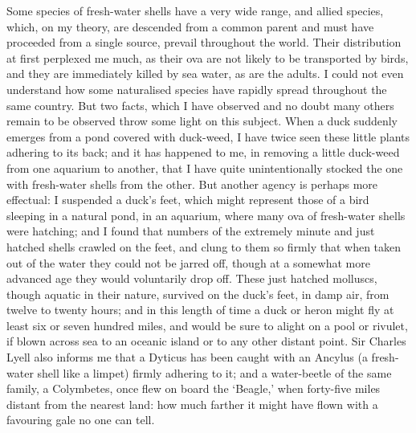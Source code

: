 \indent Some species of fresh-water shells have a very wide range, and allied species, which, on my theory, are descended from a common parent and must have proceeded from a single source, prevail throughout the world. Their distribution at first perplexed me much, as their ova are not likely to be transported by birds, and they are immediately killed by sea water, as are the adults. I could not even understand how some naturalised species have rapidly spread throughout the same country. But two facts, which I have observed and no doubt many others remain to be observed throw some light on this subject. When a duck suddenly emerges from a pond covered with duck-weed, I have twice seen these little plants adhering to its back; and it has happened to me, in removing a little duck-weed from one aquarium to another, that I have quite unintentionally stocked the one with fresh-water shells from the other. But another agency is perhaps more effectual: I suspended a duck's feet, which might represent those of a bird sleeping in a natural pond, in an aquarium, where many ova of fresh-water shells were hatching; and I found that numbers of the extremely minute and just hatched shells crawled on the feet, and clung to them so firmly that when taken out of the water they could not be jarred off, though at a somewhat more advanced age they would voluntarily drop off. These just hatched molluscs, though aquatic in their nature, survived on the duck's feet, in damp air, from twelve to twenty hours; and in this length of time a duck or heron might fly at least six or seven hundred miles, and would be sure to alight on a pool or rivulet, if blown across sea to an oceanic island or to any other distant point. Sir Charles Lyell also informs me that a Dyticus has been caught with an Ancylus (a fresh-water shell like a limpet) firmly adhering to it; and a water-beetle of the same family, a Colymbetes, once flew on board the `Beagle,' when forty-five miles distant from the nearest land: how much farther it might have flown with a favouring gale no one can tell.~\\
